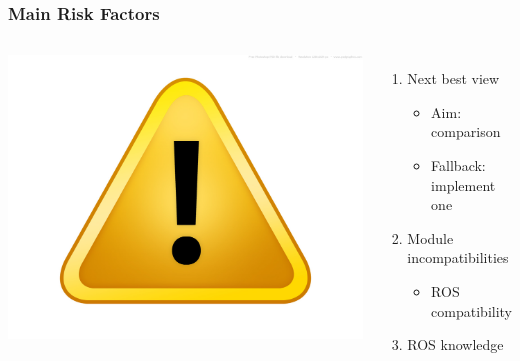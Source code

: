 
\begin{frame} \frametitle{Main Risk Factors}

	\vfill

	\begin{columns}[c]
	
		\includegraphics[width=\linewidth]{./src/warning.jpg}

		\begin{enumerate}\itemsep16pt
			\item Next best view
			\begin{itemize}\itemsep10pt
				\item Aim: comparison
				\item Fallback: implement one
			\end{itemize}
			\item Module incompatibilities
			\begin{itemize}\itemsep10pt
				\item ROS compatibility
			\end{itemize}
			\item ROS knowledge
		\end{enumerate}
	
	\end{columns}

	\vfill

\end{frame}